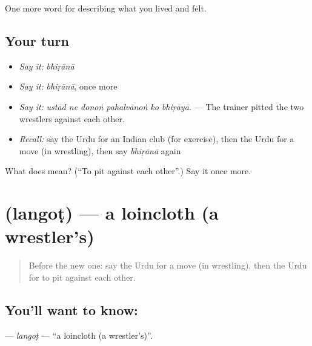 \begin{grammarlens}[title={What you've built}]
One more word for describing what you lived and felt.
\end{grammarlens}

\subsection*{Your turn}
\begin{itemize}
\raggedright
  \item \emph{Say it:} \emph{bhiṛānā}
  \item \emph{Say it:} \emph{bhiṛānā}, once more
  \item \emph{Say it:} \emph{ustād ne donoṅ pahalvānoṅ ko bhiṛāyā.} — The trainer pitted the two wrestlers against each other.
  \item \emph{Recall:} say the Urdu for an Indian club (for exercise), then the Urdu for a move (in wrestling), then say \emph{bhiṛānā} again
\end{itemize}

\begin{tcolorbox}[breakable,colback=teal!4,colframe=teal!35!black,title={Before you move on}]
What does  mean? (\textquotedblleft{}To pit against each other\textquotedblright{}.) Say it once more.
\end{tcolorbox}
\section[\texorpdfstring{\ur{لنگوٹ} (langoṭ)}{لنگوٹ (langoṭ)}]{ (langoṭ) — a loincloth (a wrestler's)}

\label{lesson:UR-C520-langot}



\begin{quote}
Before the new one: say the Urdu for a move (in wrestling), then the Urdu for to pit against each other.
\end{quote}

\subsection*{You'll want to know: }
\textbf{} — \emph{langoṭ} — \textquotedblleft{}a loincloth (a wrestler's)\textquotedblright{}.

\begin{quote}
      
\end{quote}

